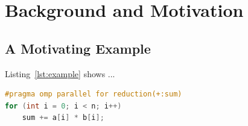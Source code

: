 \section{Background and Motivation}
\label{sec:background}


\subsection{A Motivating Example}
Listing~\ref{lst:example} shows ...

\begin{lstlisting}[language=C, caption={A simple OpenMP parallel loop.},
                   label={lst:example}]
#pragma omp parallel for reduction(+:sum)
for (int i = 0; i < n; i++)
    sum += a[i] * b[i];
\end{lstlisting}
